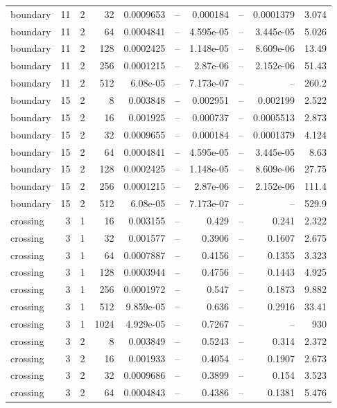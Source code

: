 \begin{tabular}{lrrrrrrrrr}
boundary & 11 & 2 & 32 & 0.0009653 & -- & 0.000184 & -- & 0.0001379 & 3.074 \\
boundary & 11 & 2 & 64 & 0.0004841 & -- & 4.595e-05 & -- & 3.445e-05 & 5.026 \\
boundary & 11 & 2 & 128 & 0.0002425 & -- & 1.148e-05 & -- & 8.609e-06 & 13.49 \\
boundary & 11 & 2 & 256 & 0.0001215 & -- & 2.87e-06 & -- & 2.152e-06 & 51.43 \\
boundary & 11 & 2 & 512 & 6.08e-05 & -- & 7.173e-07 & -- & -- & 260.2 \\
boundary & 15 & 2 & 8 & 0.003848 & -- & 0.002951 & -- & 0.002199 & 2.522 \\
boundary & 15 & 2 & 16 & 0.001925 & -- & 0.000737 & -- & 0.0005513 & 2.873 \\
boundary & 15 & 2 & 32 & 0.0009655 & -- & 0.000184 & -- & 0.0001379 & 4.124 \\
boundary & 15 & 2 & 64 & 0.0004841 & -- & 4.595e-05 & -- & 3.445e-05 & 8.63 \\
boundary & 15 & 2 & 128 & 0.0002425 & -- & 1.148e-05 & -- & 8.609e-06 & 27.75 \\
boundary & 15 & 2 & 256 & 0.0001215 & -- & 2.87e-06 & -- & 2.152e-06 & 111.4 \\
boundary & 15 & 2 & 512 & 6.08e-05 & -- & 7.173e-07 & -- & -- & 529.9 \\
crossing & 3 & 1 & 16 & 0.003155 & -- & 0.429 & -- & 0.241 & 2.322 \\
crossing & 3 & 1 & 32 & 0.001577 & -- & 0.3906 & -- & 0.1607 & 2.675 \\
crossing & 3 & 1 & 64 & 0.0007887 & -- & 0.4156 & -- & 0.1355 & 3.323 \\
crossing & 3 & 1 & 128 & 0.0003944 & -- & 0.4756 & -- & 0.1443 & 4.925 \\
crossing & 3 & 1 & 256 & 0.0001972 & -- & 0.547 & -- & 0.1873 & 9.882 \\
crossing & 3 & 1 & 512 & 9.859e-05 & -- & 0.636 & -- & 0.2916 & 33.41 \\
crossing & 3 & 1 & 1024 & 4.929e-05 & -- & 0.7267 & -- & -- & 930 \\
crossing & 3 & 2 & 8 & 0.003849 & -- & 0.5243 & -- & 0.314 & 2.372 \\
crossing & 3 & 2 & 16 & 0.001933 & -- & 0.4054 & -- & 0.1907 & 2.673 \\
crossing & 3 & 2 & 32 & 0.0009686 & -- & 0.3899 & -- & 0.154 & 3.523 \\
crossing & 3 & 2 & 64 & 0.0004843 & -- & 0.4386 & -- & 0.1381 & 5.476 \\

\end{tabular}
